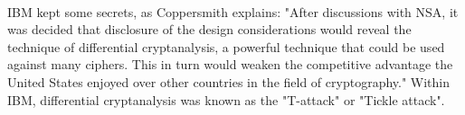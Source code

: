 \documentclass[twoside, twocolumn]{article}
\begin{document}
\

IBM kept some secrets, as Coppersmith explains: "After discussions with NSA, 
it was decided that disclosure of the design considerations would reveal the technique of differential cryptanalysis, 
a powerful technique that could be used against many ciphers. This in turn would weaken the competitive 
advantage the United States enjoyed over other countries in the field of cryptography." 
Within IBM, differential cryptanalysis was known as the "T-attack" or "Tickle attack".


\
\end{document}
